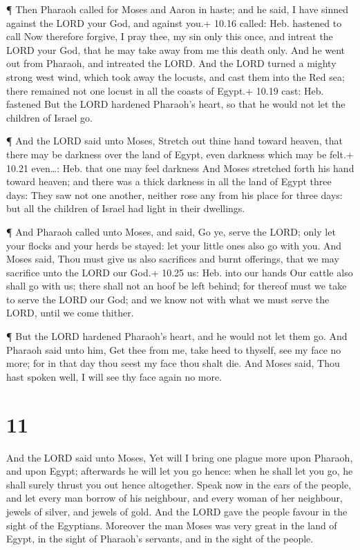 ¶ Then Pharaoh called for Moses and Aaron in haste; and he
said, I have sinned against the LORD your God, and against you.+ 10.16
called: Heb. hastened to call  Now therefore forgive, I
pray thee, my sin only this once, and intreat the LORD your God, that he
may take away from me this death only.  And he went out
from Pharaoh, and intreated the LORD.  And the LORD turned
a mighty strong west wind, which took away the locusts, and cast them
into the Red sea; there remained not one locust in all the coasts of
Egypt.+ 10.19 cast: Heb. fastened  But the LORD hardened
Pharaoh's heart, so that he would not let the children of Israel go.

 ¶ And the LORD said unto Moses, Stretch out thine hand
toward heaven, that there may be darkness over the land of Egypt, even
darkness which may be felt.+ 10.21 even\ldots: Heb. that one may feel
darkness  And Moses stretched forth his hand toward heaven;
and there was a thick darkness in all the land of Egypt three days:
 They saw not one another, neither rose any from his place
for three days: but all the children of Israel had light in their
dwellings.

 ¶ And Pharaoh called unto Moses, and said, Go ye, serve
the LORD; only let your flocks and your herds be stayed: let your little
ones also go with you.  And Moses said, Thou must give us
also sacrifices and burnt offerings, that we may sacrifice unto the LORD
our God.+ 10.25 us: Heb. into our hands  Our cattle also
shall go with us; there shall not an hoof be left behind; for thereof
must we take to serve the LORD our God; and we know not with what we
must serve the LORD, until we come thither.

 ¶ But the LORD hardened Pharaoh's heart, and he would not
let them go.  And Pharaoh said unto him, Get thee from me,
take heed to thyself, see my face no more; for in that day thou seest my
face thou shalt die.  And Moses said, Thou hast spoken
well, I will see thy face again no more.

\hypertarget{section-10}{%
\section{11}\label{section-10}}

 And the LORD said unto Moses, Yet will I bring one plague
more upon Pharaoh, and upon Egypt; afterwards he will let you go hence:
when he shall let you go, he shall surely thrust you out hence
altogether.  Speak now in the ears of the people, and let
every man borrow of his neighbour, and every woman of her neighbour,
jewels of silver, and jewels of gold.  And the LORD gave the
people favour in the sight of the Egyptians. Moreover the man Moses was
very great in the land of Egypt, in the sight of Pharaoh's servants, and
in the sight of the people.

